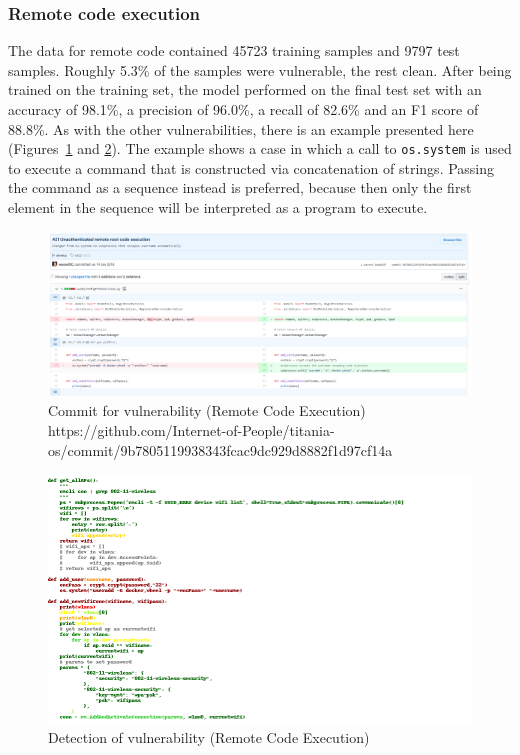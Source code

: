 \documentclass[
a4paper,
pagesize,
pdftex,
12pt,
twoside, %
BCOR=5mm, %
ngerman,
fleqn,
final,
]{scrartcl}
\begin{document}
\newpage
	\subsubsection{Remote code execution}
	The data for remote code contained 45723 training samples and 9797 test samples. Roughly 5.3\% of the samples were vulnerable, the rest clean. After being trained on the training set, the model performed on the final test set with an accuracy of 98.1\%, a precision of 96.0\%, a recall of 82.6\% and an F1 score of 88.8\%. As with the other vulnerabilities, there is an example presented here (Figures~\ref{fig:remote_code_executionA} and \ref{fig:remote_code_executionAr}). The example shows a case in which a call to \texttt{os.system} is used to execute a command that is constructed via concatenation of strings. Passing the command as a sequence instead is preferred, because then only the first element in the sequence will be interpreted as a program to execute.	
	\begin{figure}[H]
		\centering
		\includegraphics[width=\linewidth]{Images/remote_code_executionA}
		\caption{Commit for vulnerability (Remote Code Execution) \newline \scriptsize{https://github.com/Internet-of-People/titania-os/commit/9b7805119938343fcac9dc929d8882f1d97cf14a}}
		\label{fig:remote_code_executionA}
	\end{figure}
	\begin{figure}[H]
		\centering
		\includegraphics[width=\linewidth]{Images/remote_code_executionAr}
		\caption{Detection of vulnerability (Remote Code Execution)}
		\label{fig:remote_code_executionAr}
	\end{figure}
	
\end{document}
